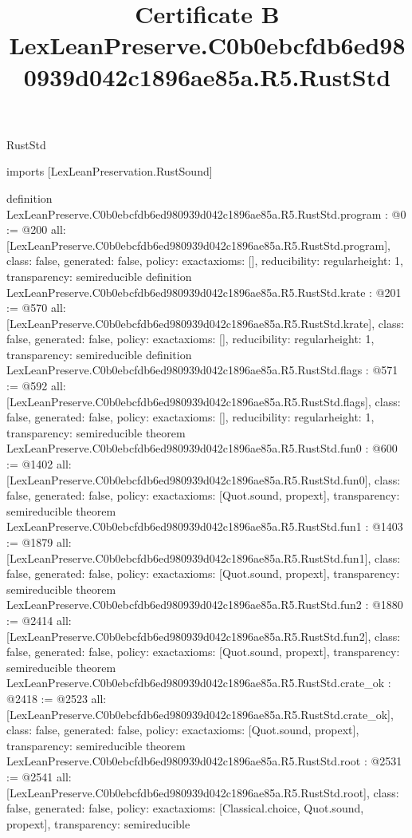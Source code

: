 \begin{lexlean}{RustStd}
\title{Certificate B LexLeanPreserve.C0b0ebcfdb6ed980939d042c1896ae85a.R5.RustStd}
\begin{coremodule}
imports [LexLeanPreservation.RustSound]

definition LexLeanPreserve.C0b0ebcfdb6ed980939d042c1896ae85a.R5.RustStd.program : @0 := @200 {
  all: [LexLeanPreserve.C0b0ebcfdb6ed980939d042c1896ae85a.R5.RustStd.program],
  class: false,
  generated: false,
  policy: exact{axioms: []},
  reducibility: regular{height: 1},
  transparency: semireducible
}
definition LexLeanPreserve.C0b0ebcfdb6ed980939d042c1896ae85a.R5.RustStd.krate : @201 := @570 {
  all: [LexLeanPreserve.C0b0ebcfdb6ed980939d042c1896ae85a.R5.RustStd.krate],
  class: false,
  generated: false,
  policy: exact{axioms: []},
  reducibility: regular{height: 1},
  transparency: semireducible
}
definition LexLeanPreserve.C0b0ebcfdb6ed980939d042c1896ae85a.R5.RustStd.flags : @571 := @592 {
  all: [LexLeanPreserve.C0b0ebcfdb6ed980939d042c1896ae85a.R5.RustStd.flags],
  class: false,
  generated: false,
  policy: exact{axioms: []},
  reducibility: regular{height: 1},
  transparency: semireducible
}
theorem LexLeanPreserve.C0b0ebcfdb6ed980939d042c1896ae85a.R5.RustStd.fun0 : @600 := @1402 {
  all: [LexLeanPreserve.C0b0ebcfdb6ed980939d042c1896ae85a.R5.RustStd.fun0],
  class: false,
  generated: false,
  policy: exact{axioms: [Quot.sound, propext]},
  transparency: semireducible
}
theorem LexLeanPreserve.C0b0ebcfdb6ed980939d042c1896ae85a.R5.RustStd.fun1 : @1403 := @1879 {
  all: [LexLeanPreserve.C0b0ebcfdb6ed980939d042c1896ae85a.R5.RustStd.fun1],
  class: false,
  generated: false,
  policy: exact{axioms: [Quot.sound, propext]},
  transparency: semireducible
}
theorem LexLeanPreserve.C0b0ebcfdb6ed980939d042c1896ae85a.R5.RustStd.fun2 : @1880 := @2414 {
  all: [LexLeanPreserve.C0b0ebcfdb6ed980939d042c1896ae85a.R5.RustStd.fun2],
  class: false,
  generated: false,
  policy: exact{axioms: [Quot.sound, propext]},
  transparency: semireducible
}
theorem LexLeanPreserve.C0b0ebcfdb6ed980939d042c1896ae85a.R5.RustStd.crate_ok : @2418 := @2523 {
  all: [LexLeanPreserve.C0b0ebcfdb6ed980939d042c1896ae85a.R5.RustStd.crate_ok],
  class: false,
  generated: false,
  policy: exact{axioms: [Quot.sound, propext]},
  transparency: semireducible
}
theorem LexLeanPreserve.C0b0ebcfdb6ed980939d042c1896ae85a.R5.RustStd.root : @2531 := @2541 {
  all: [LexLeanPreserve.C0b0ebcfdb6ed980939d042c1896ae85a.R5.RustStd.root],
  class: false,
  generated: false,
  policy: exact{axioms: [Classical.choice, Quot.sound, propext]},
  transparency: semireducible
}


\end{coremodule}
\end{lexlean}
